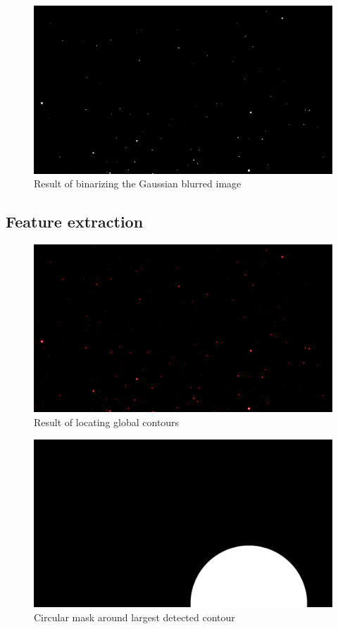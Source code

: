 \documentclass[10pt,twocolumn,letterpaper]{article}
\begin{document}
\begin{figure}[H]
  \centering
   \includegraphics[width=0.9\linewidth]{binary}
   \caption{Result of binarizing the Gaussian blurred image}
   \label{fig:star_binary}
\end{figure}

\subsection{Feature extraction}

\begin{figure}[H]
  \centering
   \includegraphics[width=0.9\linewidth]{all_contours}
   \caption{Result of locating global contours}
   \label{fig:star_contours}
\end{figure}

\begin{figure}[H]
  \centering
   \includegraphics[width=0.9\linewidth]{mask}
   \caption{Circular mask around largest detected contour}
   \label{fig:star_mask}
\end{figure}
\end{document}

